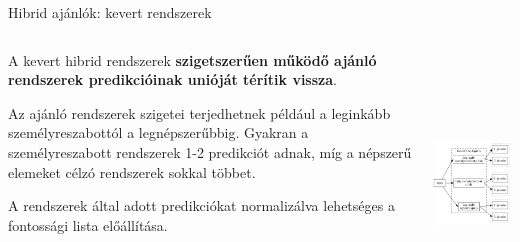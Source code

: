 \documentclass[english, aspectratio=169]{beamer}
\begin{document}
\begin{frame}{Hibrid ajánlók: kevert rendszerek}
\begin{columns}
\begin{column}{.5\textwidth}
A kevert hibrid rendszerek \textbf{szigetszerűen működő ajánló rendszerek predikcióinak unióját térítik vissza}.\par\smallskip
Az ajánló rendszerek szigetei terjedhetnek például a leginkább személyreszabottól a legnépszerűbbig. Gyakran a személyreszabott rendszerek 1-2 predikciót adnak, míg a népszerű elemeket célzó rendszerek sokkal többet.\par\smallskip
A rendszerek által adott predikciókat normalizálva lehetséges a fontossági lista előállítása. 
\end{column}
\begin{column}{.5\textwidth}
\begin{center}
\includegraphics[width=7cm, height=7cm, keepaspectratio]{graphs/recommender_12.png}
\end{center}
\end{column}
\end{columns}
\end{frame}
\end{document}
